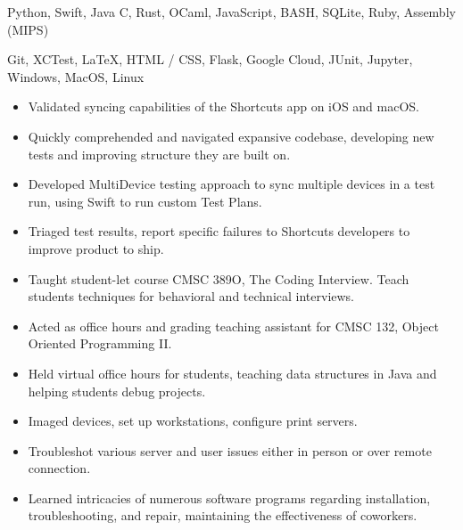 \documentclass[11pt]{article}
\begin{document}
\setlength\topsep{0pt}
{\fontsize{10}{12}\robotocondlight
     Python, Swift, Java  C, Rust, OCaml, JavaScript, BASH, SQLite, Ruby, Assembly (MIPS)\par
    Git, XCTest, \LaTeX, HTML / CSS, Flask, Google Cloud, JUnit, Jupyter, Windows, MacOS, Linux \par
}

\hsep

\vspace{2mm}
{\fontsize{10}{12}\robotocondlight
    \begin{itemize}[noitemsep,nolistsep]
        \item Validated syncing capabilities of the Shortcuts app on iOS and macOS. 
        \item Quickly comprehended and navigated expansive codebase, developing new tests and improving structure they are built on. 
        \item Developed MultiDevice testing approach to sync multiple devices in a test run, using Swift to run custom Test Plans.
        \item Triaged test results, report specific failures to Shortcuts developers to improve product to ship.
    \end{itemize}
    \vspace{3mm}
    \begin{itemize}[noitemsep,nolistsep]
        \item Taught student-let course CMSC 389O, The Coding Interview. Teach students techniques for behavioral and technical interviews. 
        \item Acted as office hours and grading teaching assistant for CMSC 132, Object Oriented Programming II.
        \item Held virtual office hours for students, teaching data structures in Java and helping students debug projects.
    \end{itemize}
    \vspace{3mm}

    \begin{itemize}[noitemsep,nolistsep]
        \item Imaged devices, set up workstations, configure print servers. 
        \item Troubleshot various server and user issues either in person or over remote connection.
        \item Learned intricacies of numerous software programs regarding installation, troubleshooting, and repair, maintaining the effectiveness of coworkers. 
    \end{itemize}
    \vspace{3mm}

}
\end{document}
